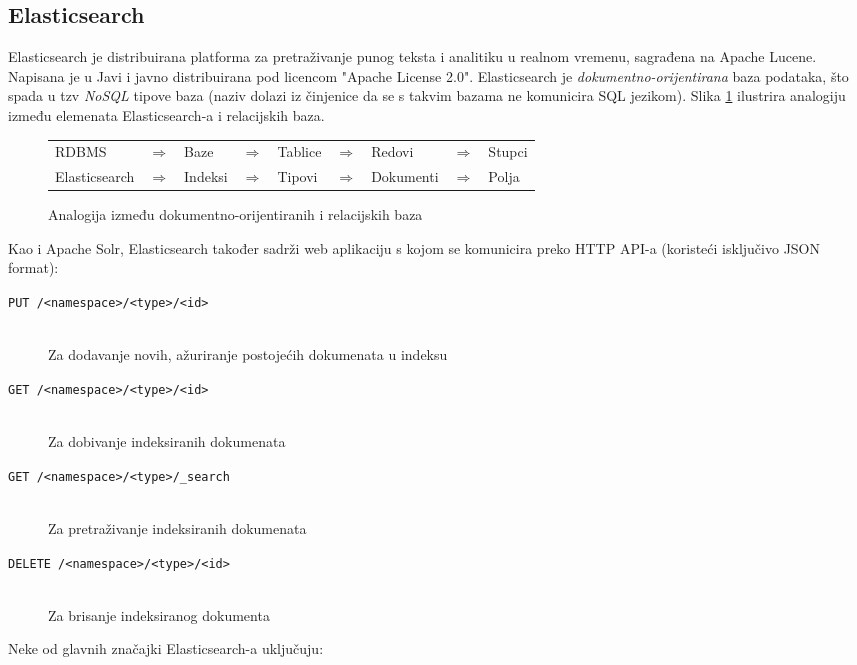 \documentclass[a4paper,twoside,12pt]{scrreprt}
\begin{document}
\subsection{Elasticsearch}

Elasticsearch je distribuirana platforma za pretraživanje punog teksta i analitiku u realnom vremenu, sagrađena na Apache Lucene. Napisana je u Javi i javno distribuirana pod licencom "Apache License 2.0". Elasticsearch je \textit{dokumentno-orijentirana} baza podataka, što spada u tzv \textit{NoSQL} tipove baza (naziv dolazi iz činjenice da se s takvim bazama ne komunicira SQL jezikom). Slika \ref{elasticsearch} ilustrira analogiju između elemenata Elasticsearch-a i relacijskih baza.

\begin{figure}[H]
  \centering
  \begin{tabular}{lllllllll}
    RDBMS         & $\Rightarrow$ & Baze    & $\Rightarrow$ & Tablice & $\Rightarrow$ & Redovi    & $\Rightarrow$ & Stupci \\
    Elasticsearch & $\Rightarrow$ & Indeksi & $\Rightarrow$ & Tipovi  & $\Rightarrow$ & Dokumenti & $\Rightarrow$ & Polja  \\
  \end{tabular}
  \caption{Analogija između dokumentno-orijentiranih i relacijskih baza}
  \label{elasticsearch}
\end{figure}

Kao i Apache Solr, Elasticsearch također sadrži web aplikaciju s kojom se komunicira preko HTTP API-a (koristeći isključivo JSON format):

\begin{description}
  \item[\texttt{PUT /<namespace>/<type>/<id>}] \hfill \\ Za dodavanje novih, ažuriranje postojećih dokumenata u indeksu
  \item[\texttt{GET /<namespace>/<type>/<id>}] \hfill \\ Za dobivanje indeksiranih dokumenata
  \item[\texttt{GET /<namespace>/<type>/\_search}] \hfill \\ Za pretraživanje indeksiranih dokumenata
  \item[\texttt{DELETE /<namespace>/<type>/<id>}] \hfill \\ Za brisanje indeksiranog dokumenta
\end{description}

Neke od glavnih značajki Elasticsearch-a uključuju:
\end{document}
